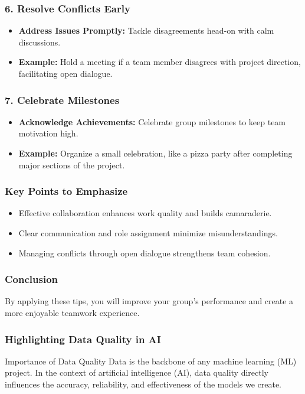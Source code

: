 \documentclass[aspectratio=169]{beamer}
\begin{document}
\begin{frame}[fragile]
    \frametitle{6. Resolve Conflicts Early}
    \begin{itemize}
        \item \textbf{Address Issues Promptly:} Tackle disagreements head-on with calm discussions.
        \item \textbf{Example:} Hold a meeting if a team member disagrees with project direction, facilitating open dialogue.
    \end{itemize}
\end{frame}

\begin{frame}[fragile]
    \frametitle{7. Celebrate Milestones}
    \begin{itemize}
        \item \textbf{Acknowledge Achievements:} Celebrate group milestones to keep team motivation high.
        \item \textbf{Example:} Organize a small celebration, like a pizza party after completing major sections of the project.
    \end{itemize}
\end{frame}

\begin{frame}[fragile]
    \frametitle{Key Points to Emphasize}
    \begin{itemize}
        \item Effective collaboration enhances work quality and builds camaraderie.
        \item Clear communication and role assignment minimize misunderstandings.
        \item Managing conflicts through open dialogue strengthens team cohesion.
    \end{itemize}
\end{frame}

\begin{frame}[fragile]
    \frametitle{Conclusion}
    By applying these tips, you will improve your group's performance and create a more enjoyable teamwork experience.
\end{frame}

\begin{frame}[fragile]
    \frametitle{Highlighting Data Quality in AI}
    \begin{block}{Importance of Data Quality}
        Data is the backbone of any machine learning (ML) project. In the context of artificial intelligence (AI), data quality directly influences the accuracy, reliability, and effectiveness of the models we create.
    \end{block}
\end{frame}
\end{document}
